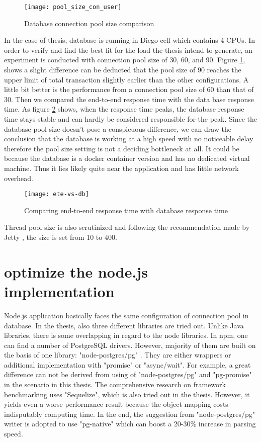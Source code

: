 \begin{figure}[h]
	\centering
	\texttt{[image: pool\_size\_con\_user]}
	\caption{Database connection pool size comparison}
	\label{pool-comparison}
\end{figure}
In the case of thesis, database is running in Diego cell which contains 4 CPUs. In order to verify and find the best fit for the load the thesis intend to generate, an experiment is conducted with connection pool size of 30, 60, and 90.  Figure \ref{pool-comparison}, shows a slight difference can be deducted that the pool size of 90 reaches the upper limit of total transaction slightly earlier than the other configurations. A little bit better is the performance from a connection pool size of 60 than that of 30. Then we compared the end-to-end response time with the data base response time.  As figure \ref{ete-vs-db} shows, when the response time peaks, the database response time stays stable and can hardly be considered responsible for the peak. Since the database pool size doesn't pose a conspicuous difference, we can draw the conclusion that the database is working at a high speed with no noticeable delay therefore the pool size setting is not a deciding bottleneck at all. It could be because the database is a docker container version and has no dedicated virtual machine. Thus it lies likely quite near the application and has little network overhead. 

\begin{figure}[h]
	\centering
	\texttt{[image: ete-vs-db]}
	\caption{Comparing end-to-end response time with database response time}
	\label{ete-vs-db}
\end{figure}

Thread pool size is also scrutinized and following the recommendation made by Jetty \citep{threadpool}, the size is set from 10 to 400. \\


\section{optimize the node.js implementation}
Node.js application basically faces the same configuration of connection pool in database. In the thesis, also three different libraries are tried out. Unlike Java libraries, there is some overlapping in regard to the node libraries. In npm, one can find a number of PostgreSQL drivers. However, majority of them are built on the basis of one library: "node-postgres/pg" \citep{node-pg}. They are either wrappers or additional implementation with "promise" or "async/wait". For example, a great difference can not be derived from using of "node-postgres/pg" and "pg-promise" in the scenario in this thesis. The comprehensive research on framework benchmarking \citep{benchmark} uses "Sequelize", which is also tried out in the thesis. However, it yields even a worse performance result because the object mapping costs indisputably computing time. In the end, the suggestion from "node-postgres/pg" writer is adopted to use "pg-native" which can boost a 20-30\% increase in parsing speed.\\




